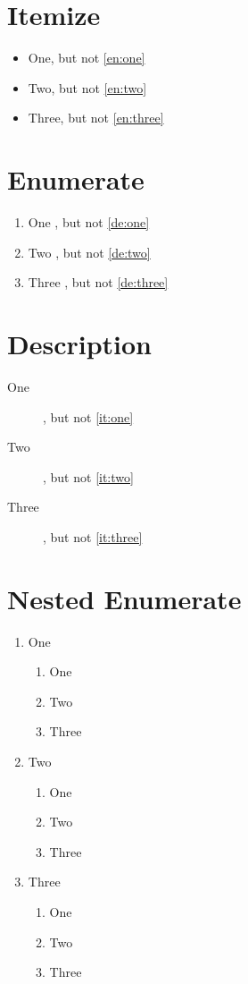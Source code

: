 \documentclass{article}
\begin{document}
\section{Itemize}
\begin{itemize}
  \item One\label{it:one}, but not \ref{en:one}
  \item Two\label{it:two}, but not \ref{en:two}
  \item Three\label{it:three}, but not \ref{en:three}
\end{itemize}

\section{Enumerate}
\begin{enumerate}
  \item One \label{en:one}, but not \ref{de:one}
  \item Two \label{en:two}, but not \ref{de:two}
  \item Three \label{en:three}, but not \ref{de:three}
\end{enumerate}

\section{Description}
\begin{description}
  \item[One] \label{de:one}, but not \ref{it:one}
  \item[Two] \label{de:two}, but not \ref{it:two}
  \item[Three] \label{de:three}, but not \ref{it:three}
\end{description}

\section{Nested Enumerate}
\begin{enumerate}
  \item One
\begin{enumerate}
  \item One
  \item Two
  \item Three
\end{enumerate}
  \item Two
\begin{enumerate}
  \item One
  \item Two
  \item Three
\end{enumerate}
  \item Three
\begin{enumerate}
  \item One
  \item Two
  \item Three
\end{enumerate}
\end{enumerate}
\end{document}
